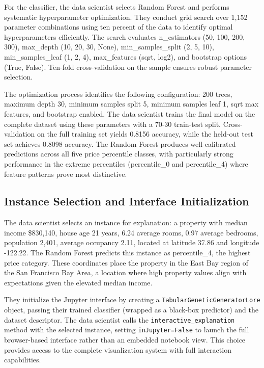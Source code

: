 For the classifier, the data scientist selects Random Forest and performs systematic hyperparameter optimization. They conduct grid search over 1,152 parameter combinations using ten percent of the data to identify optimal hyperparameters efficiently. The search evaluates n\_estimators (50, 100, 200, 300), max\_depth (10, 20, 30, None), min\_samples\_split (2, 5, 10), min\_samples\_leaf (1, 2, 4), max\_features (sqrt, log2), and bootstrap options (True, False). Ten-fold cross-validation on the sample ensures robust parameter selection.

The optimization process identifies the following configuration: 200 trees, maximum depth 30, minimum samples split 5, minimum samples leaf 1, sqrt max features, and bootstrap enabled. The data scientist trains the final model on the complete dataset using these parameters with a 70-30 train-test split. Cross-validation on the full training set yields 0.8156 accuracy, while the held-out test set achieves 0.8098 accuracy. The Random Forest produces well-calibrated predictions across all five price percentile classes, with particularly strong performance in the extreme percentiles (percentile\_0 and percentile\_4) where feature patterns prove most distinctive.

\subsection{Instance Selection and Interface Initialization}

The data scientist selects an instance for explanation: a property with median income \$830,140, house age 21 years, 6.24 average rooms, 0.97 average bedrooms, population 2,401, average occupancy 2.11, located at latitude 37.86 and longitude -122.22. The Random Forest predicts this instance as percentile\_4, the highest price category. These coordinates place the property in the East Bay region of the San Francisco Bay Area, a location where high property values align with expectations given the elevated median income.

They initialize the Jupyter interface by creating a \texttt{TabularGeneticGeneratorLore} object, passing their trained classifier (wrapped as a black-box predictor) and the dataset descriptor. The data scientist calls the \texttt{interactive\_explanation} method with the selected instance, setting \texttt{inJupyter=False} to launch the full browser-based interface rather than an embedded notebook view. This choice provides access to the complete visualization system with full interaction capabilities.

